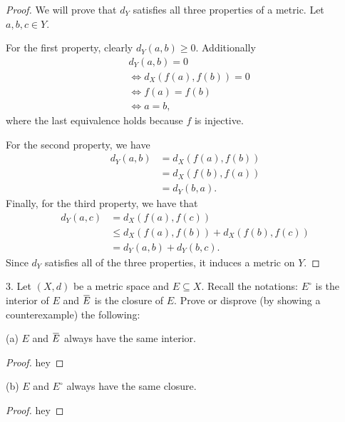 \documentclass{article}
\newcommand*\clos[1]{\mkern 1.5mu\overline{\mkern-1.5mu#1\mkern-1.5mu}\mkern 1.5mu}
\begin{document}
\begin{proof}

We will prove that $d_Y$ satisfies all three properties of a metric. Let
$a, b, c \in Y$.

For the first property, clearly $d_Y(a, b) \geq 0$. Additionally
%
\begin{align*}
    &d_Y(a, b) = 0 \\
    &\iff d_X(f(a), f(b)) = 0 \\
    &\iff f(a) = f(b) \\
    &\iff a = b
    ,
\end{align*}
%
where the last equivalence holds because $f$ is injective.

For the second property, we have
%
\begin{align*}
    d_Y(a, b) &= d_X(f(a), f(b)) \\
              &= d_X(f(b), f(a)) \\
              &= d_Y(b, a)
              .
\end{align*}
%
Finally, for the third property, we have that
%
\begin{align*}
    d_Y(a, c) &= d_X(f(a), f(c)) \\
              &\leq d_X(f(a), f(b)) + d_X(f(b), f(c)) \\
              &= d_Y(a, b) + d_Y(b, c)
              .
\end{align*}
%
Since $d_Y$ satisfies all of the three properties, it induces a metric
on $Y$.

\end{proof}

\newpage

3. Let $(X, d)$ be a metric space and $E \subseteq X$. Recall the
   notations: $E^\circ$ is the interior of $E$ and $\clos{E}$ is the
   closure of $E$. Prove or disprove (by showing a counterexample) the
   following:

   (a) $E$ and $\clos{E}$ always have the same interior.

\begin{proof}

hey

\end{proof}

(b) $E$ and $E^\circ$ always have the same closure.

\begin{proof}

hey

\end{proof}
\end{document}
